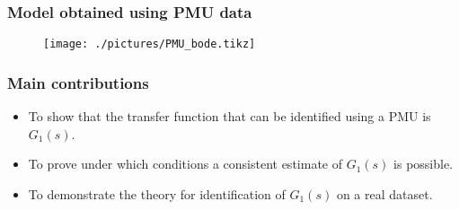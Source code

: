 \begin{frame}
	\frametitle{Model obtained using PMU data}
	\begin{figure}
		\texttt{[image: ./pictures/PMU\_bode.tikz]}
	\end{figure}
\end{frame}
\begin{frame}
	\frametitle{Main contributions}
	\begin{itemize}
		\item To show that the transfer function that can be identified using a PMU is $G_1(s)$.
		\item To prove under which conditions a consistent estimate of $G_1(s)$ is possible.
		\item To demonstrate the theory for identification of $G_1(s)$ on a real dataset.
	\end{itemize}
\end{frame}
